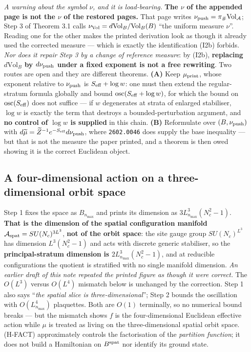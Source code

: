 \documentclass[11pt]{article}
\newcommand{\A}{\mathcal A}
\begin{document}
\emph{A warning about the symbol $\nu$, and it is load-bearing.} \textbf{The $\nu$ of
the appended page is not the $\nu$ of the restored pages.} That page writes
$\nu_{\rm push}=\pi_\#\mathrm{Vol}_{\A}$; Step 3 of Theorem 3.1 calls
$\nu_{\rm Vol}=d\mathrm{Vol}_B/\mathrm{Vol}_B(B)$ ``the uniform measure $\nu$''.
Reading one for the other makes the printed derivation look as though it already used
the corrected measure --- which is exactly the identification (I2b) forbids.
\emph{Nor does it repair Step 3 by a change of reference measure}: by (I2b),
\textbf{replacing $d\mathrm{Vol}_B$ by $d\nu_{\rm push}$ under a fixed exponent is
not a free
rewriting}. Two routes are open and they are different theorems.
\textbf{(A)} Keep $\mu_{\rm print}$, whose exponent relative to $\nu_{\rm push}$ is
$S_{\rm eff}+\log w$: one must then extend the regular-stratum formula globally and
bound $\operatorname{osc}(S_{\rm eff}+\log w)$, for which the bound on
$\operatorname{osc}(S_{\rm eff})$ does not suffice --- if $w$ degenerates at strata of
enlarged stabiliser, $\log w$ is exactly the term that destroys a bounded-perturbation
argument, and \textbf{no control of $\log w$ is supplied} in this chain.
\textbf{(B)} Reformulate over $(B,\nu_{\rm push})$ with
$d\widetilde\mu=\widetilde Z^{-1}e^{-S_{\rm eff}}d\nu_{\rm push}$, where \texttt{2602.0046} does
supply the base inequality --- but that is not the measure the paper printed, and a
theorem is then owed showing it is the correct Euclidean object.

\subsection{A four-dimensional action on a three-dimensional orbit space}

Step 1 fixes the space as $B_{n_{\max}}$ and prints its dimension as
$3L_{n_{\max}}^3(N_c^2-1)$. \textbf{That is the dimension of the spatial
configuration manifold} $\A_{\rm spat}=SU(N_c)^{3L^3}$, \textbf{not of the orbit
space}: the site gauge group $SU(N_c)^{L^3}$ has dimension $L^3(N_c^2-1)$ and acts
with discrete generic stabiliser, so the \textbf{principal-stratum dimension is
$2L_{n_{\max}}^3(N_c^2-1)$}, and at reducible configurations the quotient is
stratified with no single manifold dimension. \emph{An earlier draft of this note
repeated the printed figure as though it were correct.} The $O(L^3)$ versus
$O(L^4)$ mismatch below is unchanged by the correction. Step 1 also says
``\emph{the spatial slice is three-dimensional}''; Step 2 bounds the oscillation with
$O(L_{n_{\max}}^4)$ plaquettes. Both are $O(1)$ terminally, so no numerical bound
breaks --- but the mismatch shows $f$ is the four-dimensional Euclidean effective
action while $\mu$ is treated as living on the three-dimensional spatial orbit space.
(H-FACT) approximately controls the factorisation of the \emph{partition function}; it
does not build a Hamiltonian on $B^{\rm spat}$ nor identify its ground state.
\end{document}
